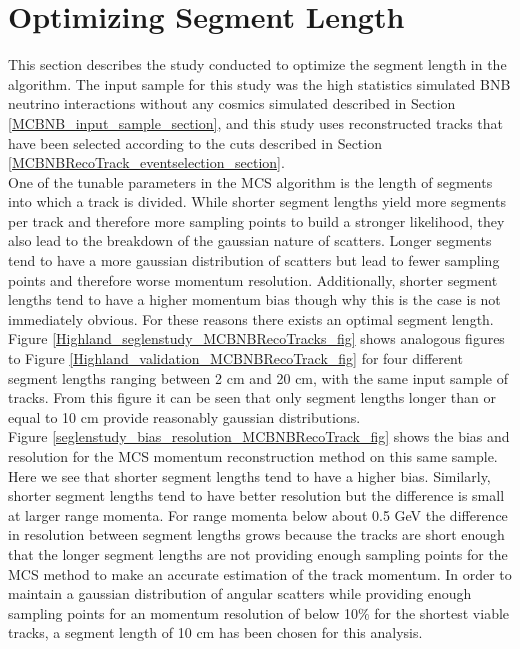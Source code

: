 
\section{Optimizing Segment Length}\label{SegmentLength_MCBNBRecoTrack_section}
This section describes the study conducted to optimize the segment length in the algorithm. The input sample for this study was the high statistics simulated BNB neutrino interactions without any cosmics simulated described in Section \ref{MCBNB_input_sample_section}, and this study uses reconstructed tracks that have been selected according to the cuts described in Section \ref{MCBNBRecoTrack_eventselection_section}.\\


One of the tunable parameters in the MCS algorithm is the length of segments into which a track is divided. While shorter segment lengths yield more segments per track and therefore more sampling points to build a stronger likelihood, they also lead to the breakdown of the gaussian nature of scatters. Longer segments tend to have a more gaussian distribution of scatters but lead to fewer sampling points and therefore worse momentum resolution. Additionally, shorter segment lengths tend to have a higher momentum bias though why this is the case is not immediately obvious. For these reasons there exists an optimal segment length. Figure \ref{Highland_seglenstudy_MCBNBRecoTracks_fig} shows analogous figures to Figure \ref{Highland_validation_MCBNBRecoTrack_fig} for four different segment lengths ranging between 2 cm and 20 cm, with the same input sample of tracks. From this figure it can be seen that only segment lengths longer than or equal to 10 cm provide reasonably gaussian distributions.\\
Figure \ref{seglenstudy_bias_resolution_MCBNBRecoTrack_fig} shows the bias and resolution for the MCS momentum reconstruction method on this same sample. Here we see that shorter segment lengths tend to have a higher bias. Similarly, shorter segment lengths tend to have better resolution but the difference is small at larger range momenta. For range momenta below about 0.5 GeV the difference in resolution between segment lengths grows because the tracks are short enough that the longer segment lengths are not providing enough sampling points for the MCS method to make an accurate estimation of the track momentum. In order to maintain a gaussian distribution of angular scatters while providing enough sampling points for an momentum resolution of below 10\% for the shortest viable tracks, a segment length of 10 cm has been chosen for this analysis.


